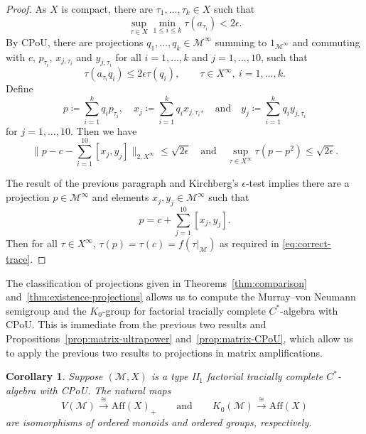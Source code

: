 \documentclass[a4paper,11pt]{amsart}
\newtheorem{corollary}[theorem]{Corollary}
\theoremstyle{definition}
\numberwithin{equation}{section}
\numberwithin{theorem}{section}
\newcommand{\M}{\mathcal{M}}
\begin{document}
\begin{proof}
	As $X$ is compact, there are $\tau_1, \ldots, \tau_k \in X$ such that
	\[ \sup_{\tau \in X} \min_{1 \leq i \leq k} \tau(a_{\tau_i}) < 2 \epsilon. \]
	By CPoU, there are projections $q_1, \ldots, q_k \in \M^\infty$ summing to $1_{\M^\infty}$ and commuting with $c$, $p_{\tau_i}$, $x_{j, \tau_i}$ and $y_{j, \tau_i}$ for all $i = 1, \ldots, k$ and $j = 1, \ldots, 10$, such that
	\begin{equation}
		\tau( a_{\tau_i} q_i) \leq 2 \epsilon \tau(q_i), \qquad  \tau \in X^\infty,\ i = 1, \ldots, k.
	\end{equation}
	Define 
	\begin{equation}
		p \coloneqq \sum_{i=1}^k q_i p_{\tau_i}, \quad x_j \coloneqq \sum_{i=1}^k q_i x_{j, \tau_i}, \quad \text{and} \quad y_j \coloneqq \sum_{i=1}^k q_i y_{j, \tau_i}
	\end{equation}
	for $j= 1, \ldots, 10$.  Then we have
	\begin{equation}
		\Big\| p - c - \sum_{i=1}^{10} [ x_j, y_j ] \Big\|_{2, X^\infty} \leq \sqrt{2\epsilon} \quad \text{and} \quad \sup_{\tau \in X^\infty} \tau(p - p^2) \leq \sqrt{2\epsilon}.
	\end{equation}
	
	The result of the previous paragraph and Kirchberg's $\epsilon$-test implies there are a projection $p \in \mathcal M^\infty$ and elements $x_j, y_j \in \M^\infty$ such that 
	\begin{equation} 
		p = c + \sum_{j=1}^{10} [x_j, y_j]. 
	\end{equation}
	Then for all $\tau \in X^\infty$, $\tau(p) = \tau(c) = f(\tau|_\M)$ as required in \eqref{eq:correct-trace}.
\end{proof}

The classification of projections given in Theorems~\ref{thm:comparison} and~\ref{thm:existence-projections} allows us to compute the Murray--von Neumann semigroup and the $K_0$-group for factorial tracially complete $C^*$-algebra with CPoU. This is immediate from the previous two results and Propositions~\ref{prop:matrix-ultrapower} and~\ref{prop:matrix-CPoU}, which allow us to apply the previous two results to projections in matrix amplifications.

\begin{corollary}
	Suppose $(\mathcal M, X)$ is a type {\rm II}$_1$ factorial tracially complete $C^*$-algebra with CPoU.  The natural maps
	\begin{equation}
		V(\mathcal M) \overset\cong\longrightarrow \mathrm{Aff}(X)_+ \qquad \text{and} \qquad K_0(\mathcal M) \overset\cong\longrightarrow \mathrm{Aff}(X)
	\end{equation}
	are isomorphisms of ordered monoids and ordered groups, respectively.
\end{corollary}
\end{document}
